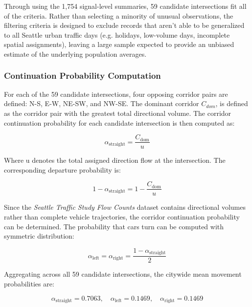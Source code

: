 \documentclass[12pt]{article}
\begin{document}
Through using the 1,754 signal-level summaries, 59 candidate intersections fit all of the criteria. Rather than selecting a minority of unusual observations, the filtering criteria is designed to exclude records that aren't able to be generalized to all Seattle urban traffic days (e.g. holidays, low-volume days, incomplete spatial assignments), leaving a large sample expected to provide an unbiased estimate of the underlying population averages.

\subsubsection{Continuation Probability Computation}

For each of the 59 candidate intersections, four opposing corridor pairs are defined: N-S, E-W, NE-SW, and NW-SE. The dominant corridor \(C_{dom}\), is defined as the corridor pair with the greatest total directional volume. The corridor continuation probability for each candidate intersection is then computed as:

\begin{equation}
\label{eq:alpha_straight}
    \alpha_{\text{straight}} = \frac{C_{\text{dom}}}{u}
\end{equation}

Where u denotes the total assigned direction flow at the intersection. The corresponding departure probability is:

\begin{equation}
\label{eq:one_minus_alpha_straight}
    1-\alpha_{\text{straight}} = 1-\frac{C_{\text{dom}}}{u}
\end{equation}



Since the \emph{Seattle Traffic Study Flow Counts} dataset contains directional volumes rather than complete vehicle trajectories, the corridor continuation probability can be determined. The probability that cars turn can be computed with symmetric distribution:

\begin{equation}
\label{eq:alpha_LR}
    \alpha_{\text{left}} = \alpha_{\text{right}} = \frac{1-\alpha_{\text{straight}}}{2}
\end{equation}



Aggregating across all 59 candidate intersections, the citywide mean movement probabilities are:

\[
\alpha_{\text{straight}} = 0.7063, \quad \alpha_{\text{left}} = 0.1469, \quad \alpha_{\text{right}} = 0.1469
\]
\end{document}
